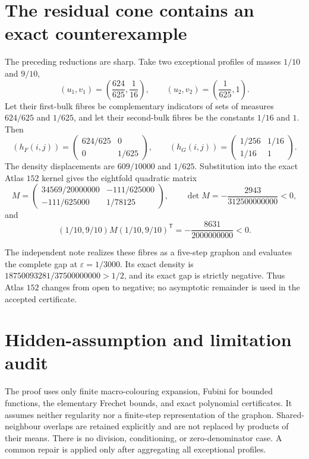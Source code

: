 \documentclass[11pt]{article}
\begin{document}
\section{The residual cone contains an exact counterexample}

The preceding reductions are sharp.  Take two exceptional profiles of
masses $1/10$ and $9/10$,
\[
 (u_1,v_1)=\left(\frac{624}{625},\frac1{16}\right),
 \qquad
 (u_2,v_2)=\left(\frac1{625},1\right).
\]
Let their first-bulk fibres be complementary indicators of sets of measures
$624/625$ and $1/625$, and let their second-bulk fibres be the constants
$1/16$ and $1$.  Then
\[
 (h_F(i,j))=\begin{pmatrix}624/625&0\\0&1/625\end{pmatrix},
 \qquad
 (h_G(i,j))=\begin{pmatrix}1/256&1/16\\1/16&1\end{pmatrix}.
\]
The density displacements are $609/10000$ and $1/625$.  Substitution into
the exact Atlas $152$ kernel gives the eightfold quadratic matrix
\begin{equation}
 M=\begin{pmatrix}
 34569/20000000&-111/625000\\
 -111/625000&1/78125
 \end{pmatrix},
 \qquad
 \det M=-\frac{2943}{312500000000}<0,
 \label{eq:atlas152-negative-matrix}
\end{equation}
and
\[
 (1/10,9/10)M(1/10,9/10)^{\mathsf T}
 =-\frac{8631}{2000000000}<0.
\]

The independent note
 realizes
these fibres as a five-step graphon and evaluates the complete gap at
$\varepsilon=1/3000$.  Its exact density is
$18750093281/37500000000>1/2$, and its exact gap is strictly negative.
Thus Atlas $152$ changes from open to negative; no asymptotic remainder is
used in the accepted certificate.

\section{Hidden-assumption and limitation audit}

The proof uses only finite macro-colouring expansion, Fubini for bounded
functions, the elementary Frechet bounds, and exact polynomial certificates.
It assumes neither regularity nor a finite-step representation of the
graphon.  Shared-neighbour overlaps are retained explicitly and are not
replaced by products of their means.  There is no division, conditioning,
or zero-denominator case.  A common repair is applied only after aggregating
all exceptional profiles.
\end{document}
